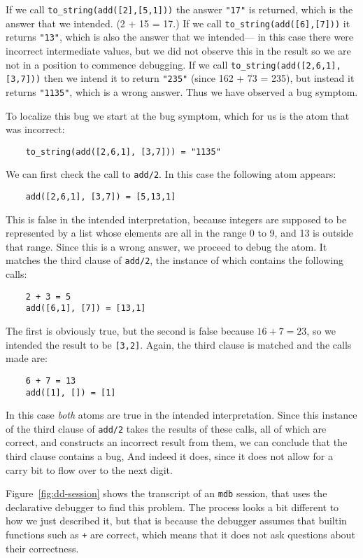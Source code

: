 If we call \texttt{to\_string(add([2],[5,1]))}
the answer \texttt{"17"} is returned,
which is the answer that we intended. (2 + 15 = 17.)
If we call \texttt{to\_string(add([6],[7]))}
it returns \texttt{"13"},
which is also the answer that we intended---%
in this case there were incorrect intermediate values,
but we did not observe this in the result
so we are not in a position to commence debugging.
If we call \texttt{to\_string(add([2,6,1],[3,7]))}
then we intend it to return \texttt{"235"} (since 162 + 73 = 235),
but instead it returns \texttt{"1135"},
which is a wrong answer.
Thus we have observed a bug symptom.

To localize this bug we start at the bug symptom,
which for us is the atom that was incorrect:
\begin{verbatim}
    to_string(add([2,6,1], [3,7])) = "1135"
\end{verbatim}
We can first check the call to \texttt{add/2}.
In this case the following atom appears:
\begin{verbatim}
    add([2,6,1], [3,7]) = [5,13,1]
\end{verbatim}
This is false in the intended interpretation,
because integers are supposed to be represented
by a list whose elements are all in the range 0 to 9,
and 13 is outside that range.
Since this is a wrong answer, we proceed to debug the atom.
It matches the third clause of \texttt{add/2},
the instance of which contains the following calls:
\begin{verbatim}
    2 + 3 = 5
    add([6,1], [7]) = [13,1]
\end{verbatim}
The first is obviously true,
but the second is false because $16 + 7 = 23$,
so we intended the result to be \texttt{[3,2]}.
Again, the third clause is matched and the calls made are:
\begin{verbatim}
    6 + 7 = 13
    add([1], []) = [1]
\end{verbatim}
In this case \emph{both} atoms are true in the intended interpretation.
Since this instance of the third clause of \texttt{add/2}
takes the results of these calls, all of which are correct,
and constructs an incorrect result from them,
we can conclude that the third clause contains a bug,
And indeed it does,
since it does not allow for a carry bit
to flow over to the next digit.

Figure~\ref{fig:dd-session} shows
the transcript of an \texttt{mdb} session,
that uses the declarative debugger to find this problem.
The process looks a bit different to how we just described it,
but that is because the debugger assumes
that builtin functions such as \texttt{+} are correct,
which means that it does not ask questions about their correctness.

